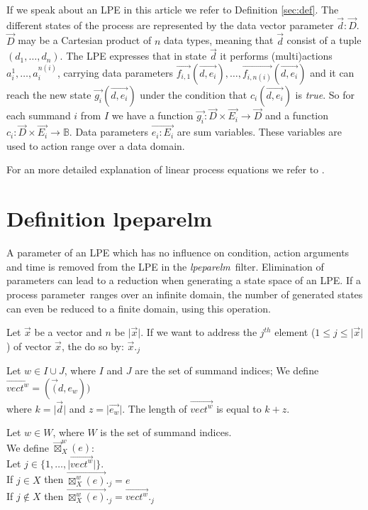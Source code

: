 \documentclass[a4paper,10pt]{article}
\theoremstyle{plain}
\theoremstyle{definition}
\newcommand{\lpe}{linear process equation}
\newcommand{\tool}{\textit{lpeparelm}}
\newcommand{\ti}{\textit}
\newcommand{\ovr}{\overrightarrow}
\newcommand{\pp}{process parameter}
\begin{document}
If we speak about an LPE in this article we refer to Definition \ref{sec:def}.  The different states 
of the process are represented by the data vector parameter $\ovr{d}:\ovr{D}$. $\ovr{D}$ may be a Cartesian product of $n$ data types, meaning that $\ovr{d}$ consist of a tuple $(d_1, \ldots, d_n)$. The LPE expresses that in state $\ovr{d}$ it performs (multi)actions $a_i^1, \ldots , a_i^{n(i)}$, carrying data parameters $\ovr{f_{i,1}}(\ovr{d,e_i}), \ldots , \ovr{f_{i,n(i)}}(\ovr{d, e_i})$ and 
it can reach the new state $\ovr{g_i}(\ovr{d ,e_i})$ under the condition that $c_i(\ovr{d , e_i})$ is \ti{true}. So for each summand $i$ from $I$ we have a function $\ovr{g_i}: \ovr{D} \times \ovr{E_i} \rightarrow \ovr{D}$ and a function $c_i: \ovr{D} \times \ovr{E_i} \rightarrow \mathbb{B}$.
Data parameters $\ovr{e_i : E_i}$ are sum variables. These variables are used to action range over a data domain. 

For an more detailed explanation of \lpe s  we refer to \cite{LPE_info}.

\section{Definition lpeparelm}
A parameter of an LPE which has no influence on condition, action arguments and time is removed from the LPE in the \tool\ filter. Elimination of parameters can lead to a reduction when generating a state space of an LPE. If a \pp\ ranges over an infinite domain, the number of generated states can even be reduced to a finite domain, using this operation. %

\begin{defn}
Let $\ovr{x}$ be a vector and  $n$ be $\vert \ovr{x} \vert$. If we want to address the $j^{th}$ element ($ 1 \leq j \leq \vert \ovr{x} \vert $) of vector $\ovr{x}$, the do so by:
$\ovr{x}._j$
\end{defn}

\begin{defn}
Let $w \in I \cup J$, where $I$ and $J$ are the set of summand indices; We define \\
 $\ovr{vect^w} = (\ovr(d , e_w))$\\
where $k = \vert \ovr{d} \vert$ and $z = \vert \ovr{e_w} \vert$. The length of $ \ovr{vect^w}$ is equal to $k + z$.
\end{defn}

\begin{defn}[$\ovr{\boxtimes}^w_X(e)$]
Let $w \in W$, where $W$ is the set of summand indices.\\
We define $\ovr{\boxtimes}^w_X(e)$:\\
Let $j \in \lbrace 1, \dots, \vert \ovr{vect^w} \vert \rbrace.$\\
If $j \in X$ then $\ovr{\boxtimes^w_X(e)}._j = e$ \\
If $j \not\in X$ then $\ovr{\boxtimes^w_X(e)}._j = \ovr{vect^w}._j$ \\
\end{defn}
\end{document}
